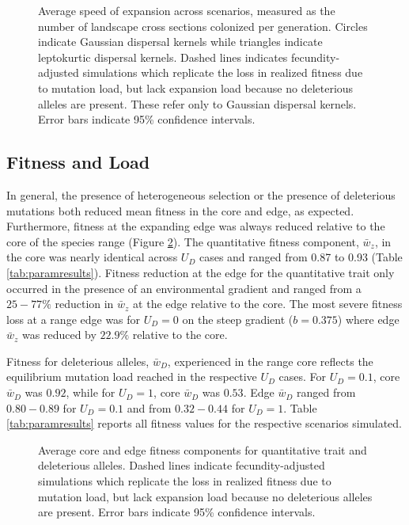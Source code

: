 \begin{figure}[h]
\centering
{}
\caption[~- Average speed of expansion.]{Average speed of expansion across scenarios, measured as the number of landscape cross sections colonized per generation. Circles indicate Gaussian dispersal kernels while triangles indicate leptokurtic dispersal kernels. Dashed lines indicates fecundity-adjusted simulations which replicate the loss in realized fitness due to mutation load, but lack expansion load because no deleterious alleles are present. These refer only to Gaussian dispersal kernels. Error bars indicate 95\% confidence intervals.}
\label{fig:speed}
\end{figure}




\subsection*{Fitness and Load}

In general, the presence of heterogeneous selection or the presence of deleterious mutations both reduced mean fitness in the core and edge, as expected. Furthermore, fitness at the expanding edge was always reduced relative to the core of the species range (Figure \ref{fig:fitness}). The quantitative fitness component, $\bar{w}_z$, in the core was nearly identical across $U_D$ cases and ranged from 0.87 to 0.93 (Table \ref{tab:paramresults}). Fitness reduction at the edge for the quantitative trait only occurred in the presence of an environmental gradient and ranged from a $25-77\%$ reduction in $\bar{w}_z$ at the edge relative to the core. The most severe fitness loss at a range edge was for $U_D = 0$ on the steep gradient ($b = 0.375$) where edge $\bar{w}_z$ was reduced by $22.9\%$ relative to the core.

Fitness for deleterious alleles, $\bar{w}_D$, experienced in the range core reflects the equilibrium mutation load reached in the respective $U_D$ cases. For  $U_D = 0.1$, core $\bar{w}_D$ was $0.92$, while for $U_D = 1$, core $\bar{w}_D$ was $0.53$. Edge $\bar{w}_D$ ranged from $0.80-0.89$ for $U_D = 0.1$ and from $0.32-0.44$ for $U_D = 1$. Table \ref{tab:paramresults} reports all fitness values for the respective scenarios simulated.


\begin{figure}[h]
\centering
{}
\caption[~- Average core and edge fitness.]{Average core and edge fitness components for quantitative trait and deleterious alleles. Dashed lines indicate fecundity-adjusted simulations which replicate the loss in realized fitness due to mutation load, but lack expansion load because no deleterious alleles are present. Error bars indicate 95\% confidence intervals.}
\label{fig:fitness}
\end{figure}



